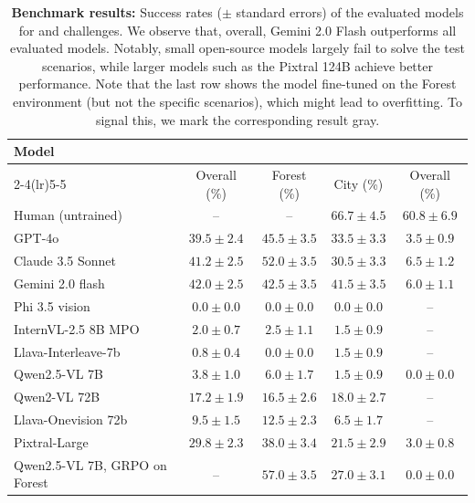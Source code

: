 \begin{table}[t]
    \centering
    \begin{footnotesize}
    \caption{\textbf{Benchmark results:} Success rates ($\pm$ standard errors) of the evaluated models for \challenge{} and \hardchallenge{} challenges. We observe that, overall, Gemini 2.0 Flash outperforms all evaluated models. Notably, small open-source models largely fail to solve the test scenarios, while larger models such as the Pixtral 124B achieve better performance.
    Note that the last row shows the model fine-tuned on the Forest environment (but not the specific \challenge{} scenarios), which might lead to overfitting. To signal this, we mark the corresponding result gray.
    }
\label{tab:main_results}
    \begin{tabular}{lcccc}
\toprule
\multirow{2}{*}{Model} & \multicolumn{3}{c}{\challenge{}} & {\hardchallenge{}} \\
\cmidrule(lr){2-4}\cmidrule(lr){5-5}
 & Overall (\%) & Forest (\%) & City (\%) & Overall (\%)\\
\midrule
Human (untrained) & -- & -- &  $66.7 \pm 4.5$ & $60.8 \pm 6.9$ \\
\midrule
GPT-4o & $ 39.5 \pm 2.4 $ & $ 45.5 \pm 3.5 $ & $ 33.5 \pm 3.3 $ & $ 3.5 \pm 0.9 $ \\
Claude 3.5 Sonnet & $ 41.2 \pm 2.5 $ & $ \mathbf{52.0 \pm 3.5} $ & $ 30.5 \pm 3.3 $ & $ \mathbf{6.5 \pm 1.2} $  \\
Gemini 2.0 flash & $ \mathbf{42.0 \pm 2.5} $ & $ 42.5 \pm 3.5 $ & $ \mathbf{41.5 \pm 3.5} $& $ 6.0 \pm 1.1 $ \\
\midrule
Phi 3.5 vision & $ 0.0 \pm 0.0 $ & $ 0.0 \pm 0.0 $ & $ 0.0 \pm 0.0 $ & --\\
InternVL-2.5 8B MPO & $ 2.0 \pm 0.7 $ & $ 2.5 \pm 1.1 $ & $ 1.5 \pm 0.9 $ & --\\
Llava-Interleave-7b & $ 0.8 \pm 0.4 $ & $ 0.0 \pm 0.0 $ & $ 1.5 \pm 0.9 $ & --\\
Qwen2.5-VL 7B & $ 3.8 \pm 1.0 $ & $ 6.0 \pm 1.7 $ & $ 1.5 \pm 0.9 $ & $0.0 \pm 0.0$ \\
\midrule
Qwen2-VL 72B & $ 17.2 \pm 1.9 $ & $ 16.5 \pm 2.6 $ & $ 18.0 \pm 2.7 $ & --\\
Llava-Onevision 72b & $ 9.5 \pm 1.5 $ & $ 12.5 \pm 2.3 $ & $ 6.5 \pm 1.7 $ & -- \\
Pixtral-Large & $ 29.8 \pm 2.3 $ & $ 38.0 \pm 3.4 $ & $ 21.5 \pm 2.9 $ & $ 3.0 \pm 0.8 $\\
\midrule
Qwen2.5-VL 7B, GRPO on Forest & -- & \color{gray}$ 57.0 \pm 3.5 $ & $ 27.0 \pm 3.1 $ & $ 0.0 \pm 0.0 $ \\
\bottomrule
\end{tabular}
\end{footnotesize}
\end{table}